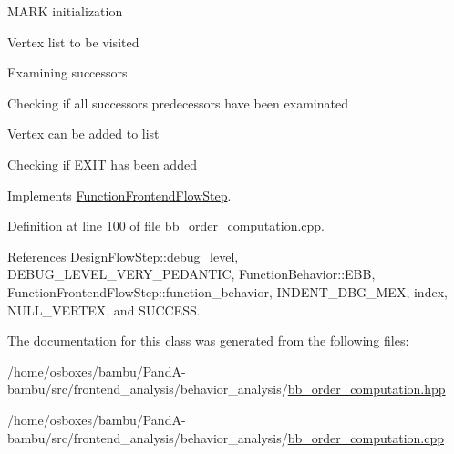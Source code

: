 M\+A\+RK initialization

Vertex list to be visited

Examining successors

Checking if all successor\textquotesingle{}s predecessors have been examinated

Vertex can be added to list

Checking if E\+X\+IT has been added 

Implements \hyperlink{classFunctionFrontendFlowStep_a00612f7fb9eabbbc8ee7e39d34e5ac68}{Function\+Frontend\+Flow\+Step}.



Definition at line 100 of file bb\+\_\+order\+\_\+computation.\+cpp.



References Design\+Flow\+Step\+::debug\+\_\+level, D\+E\+B\+U\+G\+\_\+\+L\+E\+V\+E\+L\+\_\+\+V\+E\+R\+Y\+\_\+\+P\+E\+D\+A\+N\+T\+IC, Function\+Behavior\+::\+E\+BB, Function\+Frontend\+Flow\+Step\+::function\+\_\+behavior, I\+N\+D\+E\+N\+T\+\_\+\+D\+B\+G\+\_\+\+M\+EX, index, N\+U\+L\+L\+\_\+\+V\+E\+R\+T\+EX, and S\+U\+C\+C\+E\+SS.



The documentation for this class was generated from the following files\+:\begin{DoxyCompactItemize}
\item 
/home/osboxes/bambu/\+Pand\+A-\/bambu/src/frontend\+\_\+analysis/behavior\+\_\+analysis/\hyperlink{bb__order__computation_8hpp}{bb\+\_\+order\+\_\+computation.\+hpp}\item 
/home/osboxes/bambu/\+Pand\+A-\/bambu/src/frontend\+\_\+analysis/behavior\+\_\+analysis/\hyperlink{bb__order__computation_8cpp}{bb\+\_\+order\+\_\+computation.\+cpp}\end{DoxyCompactItemize}
